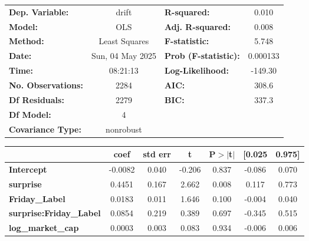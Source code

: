 \begin{center}
\begin{tabular}{lclc}
\toprule
\textbf{Dep. Variable:}         &      drift       & \textbf{  R-squared:         } &     0.010   \\
\textbf{Model:}                 &       OLS        & \textbf{  Adj. R-squared:    } &     0.008   \\
\textbf{Method:}                &  Least Squares   & \textbf{  F-statistic:       } &     5.748   \\
\textbf{Date:}                  & Sun, 04 May 2025 & \textbf{  Prob (F-statistic):} &  0.000133   \\
\textbf{Time:}                  &     08:21:13     & \textbf{  Log-Likelihood:    } &   -149.30   \\
\textbf{No. Observations:}      &        2284      & \textbf{  AIC:               } &     308.6   \\
\textbf{Df Residuals:}          &        2279      & \textbf{  BIC:               } &     337.3   \\
\textbf{Df Model:}              &           4      & \textbf{                     } &             \\
\textbf{Covariance Type:}       &    nonrobust     & \textbf{                     } &             \\
\bottomrule
\end{tabular}
\begin{tabular}{lcccccc}
                                & \textbf{coef} & \textbf{std err} & \textbf{t} & \textbf{P$> |$t$|$} & \textbf{[0.025} & \textbf{0.975]}  \\
\midrule
\textbf{Intercept}              &      -0.0082  &        0.040     &    -0.206  &         0.837        &       -0.086    &        0.070     \\
\textbf{surprise}               &       0.4451  &        0.167     &     2.662  &         0.008        &        0.117    &        0.773     \\
\textbf{Friday\_Label}          &       0.0183  &        0.011     &     1.646  &         0.100        &       -0.004    &        0.040     \\
\textbf{surprise:Friday\_Label} &       0.0854  &        0.219     &     0.389  &         0.697        &       -0.345    &        0.515     \\
\textbf{log\_market\_cap}       &       0.0003  &        0.003     &     0.083  &         0.934        &       -0.006    &        0.006     \\

\end{tabular}
\end{center}
